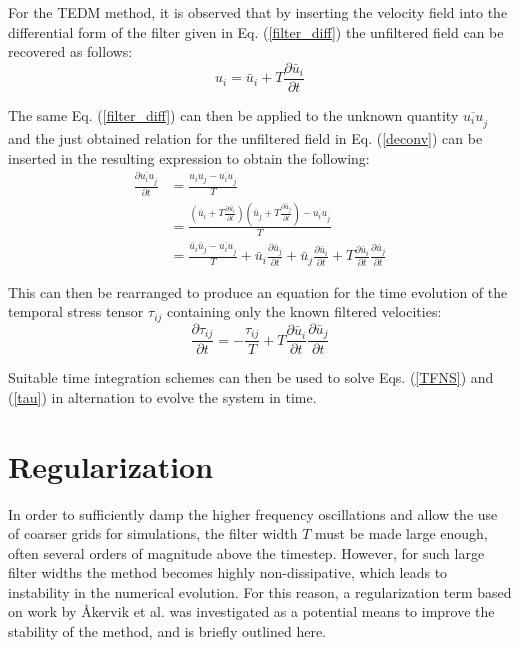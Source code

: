 For the TEDM method, it is observed that by inserting the velocity field into the differential form of the filter given in Eq. (\ref{filter_diff}) the unfiltered field can be recovered as follows:
\begin{equation} \label{deconv}
u_i=\bar{u}_i+T\frac{\partial \bar{u}_i}{\partial t}
\end{equation}

The same Eq. (\ref{filter_diff}) can then be applied to the unknown quantity $\overline{u_i u}_j$ and the just obtained relation for the unfiltered field in Eq. (\ref{deconv}) can be inserted in the resulting expression to obtain the following:
\begin{equation}
\begin{split}
\frac{\partial{\overline{u_i u}_j}}{\partial t}&=\frac{u_i u_j-\overline{u_i u}_j}{T} \\
&=\frac{\left( \bar{u}_i+T\frac{\partial \bar{u}_i}{\partial t} \right) \left( \bar{u}_j+T\frac{\partial \bar{u}_j}{\partial t} \right)-\overline{u_i u}_j}{T} \\
&=\frac{\bar{u}_i \bar{u}_j-\overline{u_i u}_j}{T}+\bar{u}_i\frac{\partial \bar{u}_j}{\partial t}+\bar{u}_j\frac{\partial \bar{u}_i}{\partial t}+T\frac{\partial \bar{u}_i}{\partial t}\frac{\partial \bar{u}_j}{\partial t}
\end{split}
\end{equation}

This can then be rearranged to produce an equation for the time evolution of the temporal stress tensor $\tau_{ij}$ containing only the known filtered velocities:
\begin{equation} \label{tau}
\frac{\partial \tau_{ij}}{\partial t}=-\frac{\tau_{ij}}{T}+T\frac{\partial \bar{u}_i}{\partial t}\frac{\partial \bar{u}_j}{\partial t}
\end{equation}

Suitable time integration schemes can then be used to solve Eqs. (\ref{TFNS}) and (\ref{tau}) in alternation to evolve the system in time.

\section{Regularization}

In order to sufficiently damp the higher frequency oscillations and allow the use of coarser grids for simulations, the filter width $T$ must be made large enough, often several orders of magnitude above the timestep. However, for such large filter widths the method becomes highly non-dissipative, which leads to instability in the numerical evolution. For this reason, a regularization term based on work by \AA kervik et al. \cite{Akervik2006} was investigated as a potential means to improve the stability of the method, and is briefly outlined here.

